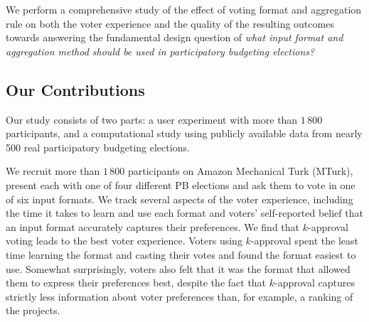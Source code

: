 \documentclass[twoside,11pt]{article}
\begin{document}
We perform   a comprehensive  study of the effect of voting format and aggregation rule on  both the voter experience and the quality of the resulting outcomes    towards answering the fundamental design question of
\emph{what input format and aggregation method should be used  in participatory budgeting elections?
}

\subsection{Our Contributions}


Our study consists of two parts: a user experiment    with more than $1\,800$ participants, and a computational study using publicly available data from nearly 500 real participatory budgeting elections. 

We recruit more than $1\,800$ participants on Amazon Mechanical Turk (MTurk),  present each with one of four different PB elections  and ask them to vote in one of six   input formats. 
We track several aspects of the voter experience, including the time it takes to learn and use each format and voters' self-reported belief that an input format accurately captures their preferences.  
%
We find that $k$-approval voting leads to the best voter experience. Voters using $k$-approval spent the least time  learning the format and casting their votes and found the format easiest to use. Somewhat surprisingly, voters also felt that  it was the format that allowed them to express their preferences best, despite the fact that $k$-approval captures strictly less information about voter preferences than, for example,  a ranking of the projects. 
\end{document}
